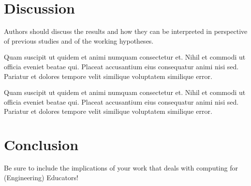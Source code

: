 \documentclass[lineno,10pt]{aseecoed}
\begin{document}
\section{Discussion}

Authors should discuss the results and how they can be interpreted in perspective of previous studies and of the working hypotheses. 

 Quam suscipit ut quidem et animi numquam consectetur et. Nihil et commodi ut officia eveniet beatae qui. Placeat accusantium eius consequatur animi nisi sed. Pariatur et dolores tempore velit similique voluptatem similique error.

 Quam suscipit ut quidem et animi numquam consectetur et. Nihil et commodi ut officia eveniet beatae qui. Placeat accusantium eius consequatur animi nisi sed. Pariatur et dolores tempore velit similique voluptatem similique error.

\section{Conclusion}

Be sure to include the implications of your work that deals with computing for (Engineering) Educators!



\end{document}
